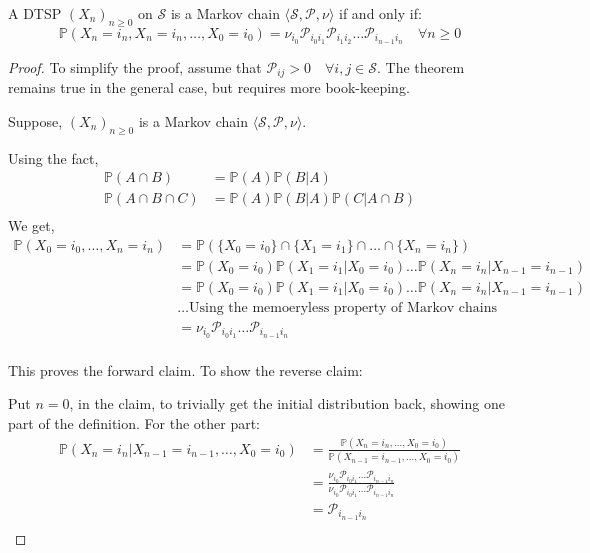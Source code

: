 \begin{theorem}
    A DTSP \({(X_n)}_{n \geq 0}\) on \(\mathcal{S}\)  is a Markov chain \(\langle \mathcal{S} , \mathcal{P} 
    ,\nu \rangle\) if and only if:
    \[
        \mathbb{P} \left( 
            X_{n} = i_{n} , X_{n} = i_{n}, \dots, X_{0} = i_{0}
            \right) = \nu _{i_{0}} \mathcal{P} _{i_{0} i_{1}}
             \mathcal{P} _{i_{1} i_{2}} \dots \mathcal{P} _{i_{n-1} i_{n}} \quad \forall n \geq 0
    \] 
\end{theorem}
\begin{proof}
    To simplify the proof, assume that \(\mathcal{P}_{ij} > 0 \quad \forall i, j \in \mathcal{S} \).
    The theorem remains true in the general case, but requires more book-keeping.

    Suppose, \({(X_n)}_{n \geq 0}\) is a Markov chain \(\langle \mathcal{S} , \mathcal{P}
    , \nu \rangle\). 
    
    Using the fact,
    \[
        \begin{aligned}
            \mathbb{P}(A \cap B) &= \mathbb{P}(A) \mathbb{P}(B | A) \\
            \mathbb{P}(A \cap B \cap C) &= \mathbb{P}(A) \mathbb{P}(B | A) \mathbb{P}(C | A \cap B) \\
        \end{aligned}
    \]
    We get,
    \[
        \begin{aligned}
            \mathbb{P}(X_0 = i_0, \dots , X_n = i_n)  & = \mathbb{P} \left( 
                \{X_0 = i_0\} \cap \{X_1 = i_1\} \cap \dots \cap \{X_n = i_n\}
             \right)\\ 
             & = \mathbb{P}(X_0 = i_0) \mathbb{P}(X_1 = i_1 | X_0 = i_0) \dots \mathbb{P}(X_n = i_n | X_{n-1} = i_{n-1}) \\
             & = \mathbb{P} (X_0 = i_0) \mathbb{P}(X_1 = i_1 | X_0 = i_0) \dots \mathbb{P}(X_n = i_n | X_{n-1} = i_{n-1}) \\
             &\dots  \text{Using the memoeryless property of Markov chains} \\
                & = \nu _{i_0} \mathcal{P} _{i_0 i_1} \dots \mathcal{P} _{i_{n-1} i_n} \\
        \end{aligned}
    \]

    This proves the forward claim. To show the reverse claim:

    Put \(n=0\), in the claim, to trivially get the initial distribution back, showing one part of the definition.
    For the other part:
    \[
    \begin{aligned}    
        \mathbb{P}(X_{n} = i_{n} | X_{n-1} = i_{n-1}, \dots, X_{0} = i_{0}) &=
         \frac{\mathbb{P}(X_{n} = i_{n}, \dots, X_{0} = i_{0})}
         {\mathbb{P}(X_{n-1} = i_{n-1}, \dots, X_{0} = i_{0})} \\
         &= \frac{\nu _{i_0} \mathcal{P} _{i_0 i_1} \dots \mathcal{P} _{i_{n-1} i_n}}
         {\nu _{i_0} \mathcal{P} _{i_0 i_1} \dots \mathcal{P} _{i_{n-1} i_n}} \\
            &= \mathcal{P} _{i_{n-1} i_n} \\
    \end{aligned}
    \]


\end{proof}
